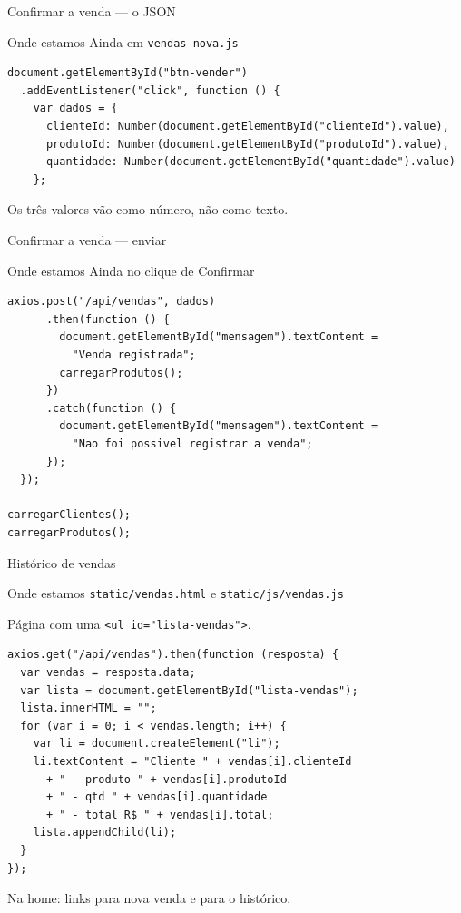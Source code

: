\documentclass[aspectratio=169,11pt]{beamer}
\newcommand{\onde}[1]{%
  \begin{block}{Onde estamos}
    #1
  \end{block}
}
\begin{document}
\begin{frame}[fragile]{Confirmar a venda --- o JSON}
  \onde{Ainda em \texttt{vendas-nova.js}}

\begin{lstlisting}[basicstyle=\ttfamily\footnotesize]
document.getElementById("btn-vender")
  .addEventListener("click", function () {
    var dados = {
      clienteId: Number(document.getElementById("clienteId").value),
      produtoId: Number(document.getElementById("produtoId").value),
      quantidade: Number(document.getElementById("quantidade").value)
    };
\end{lstlisting}

  Os três valores vão como número, não como texto.
\end{frame}

\begin{frame}[fragile]{Confirmar a venda --- enviar}
  \onde{Ainda no clique de Confirmar}

\begin{lstlisting}[basicstyle=\ttfamily\footnotesize]
    axios.post("/api/vendas", dados)
      .then(function () {
        document.getElementById("mensagem").textContent =
          "Venda registrada";
        carregarProdutos();
      })
      .catch(function () {
        document.getElementById("mensagem").textContent =
          "Nao foi possivel registrar a venda";
      });
  });

carregarClientes();
carregarProdutos();
\end{lstlisting}
\end{frame}

\begin{frame}[fragile]{Histórico de vendas}
  \onde{\texttt{static/vendas.html} e \texttt{static/js/vendas.js}}

  Página com uma \texttt{<ul id="lista-vendas">}.

\begin{lstlisting}[basicstyle=\ttfamily\scriptsize]
axios.get("/api/vendas").then(function (resposta) {
  var vendas = resposta.data;
  var lista = document.getElementById("lista-vendas");
  lista.innerHTML = "";
  for (var i = 0; i < vendas.length; i++) {
    var li = document.createElement("li");
    li.textContent = "Cliente " + vendas[i].clienteId
      + " - produto " + vendas[i].produtoId
      + " - qtd " + vendas[i].quantidade
      + " - total R$ " + vendas[i].total;
    lista.appendChild(li);
  }
});
\end{lstlisting}

  Na home: links para nova venda e para o histórico.
\end{frame}
\end{document}
